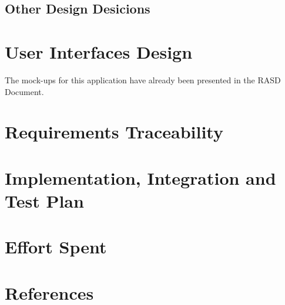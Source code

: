 \documentclass{article}
\begin{document}
\subsection{Other Design Desicions}
\newpage
\section{User Interfaces Design}
The mock-ups for this application have already been presented in the RASD Document.
\newpage
\section{Requirements Traceability}
\newpage
\section{Implementation, Integration and Test Plan}
\newpage
\section{Effort Spent}
\newpage
\section{References}
\end{document}
